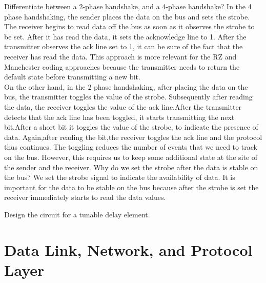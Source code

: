 \begin{ExerciseList}
\Exercise
Differentiate between a 2-phase handshake, and a 4-phase handshake?
\Answer
In the 4 phase handshaking, the sender places the data on the bus and sets the strobe. The receiver begins to read data off the bus as soon as it observes the strobe to be set. After it has read the data, it sets the acknowledge line to 1. After the transmitter observes the ack line set to 1, it can be sure of the fact that the receiver has read the data. This approach is more relevant for the RZ and Manchester coding approaches because the transmitter needs to return the default state before transmitting a new bit.\\
On the other hand, in the 2 phase handshaking, after placing the data on the bus, the transmitter toggles the value of the strobe. Subsequently after reading the data, the receiver toggles the value of the ack line.After the transmitter detects that the ack line has been toggled, it starts transmitting the next bit.After a short bit it toggles the value of the strobe, to indicate the presence of data. Again,after reading the bit,the receiver toggles the ack line and the protocol thus continues.
The toggling reduces the number of events that we need to track on the bus. However, this requires us to keep some additional state at the site of the sender and the receiver. 
\Exercise
Why do we set the strobe after the data is stable on the bus?
\Answer
We set the strobe signal to indicate the availability of data. It is important for the data to be stable on the bus because after the strobe is set the receiver immediately starts to read the data values.

\Exercise[difficulty=2]
Design the circuit for a tunable delay element.
\end{ExerciseList}

\section*{Data Link, Network, and Protocol Layer}

